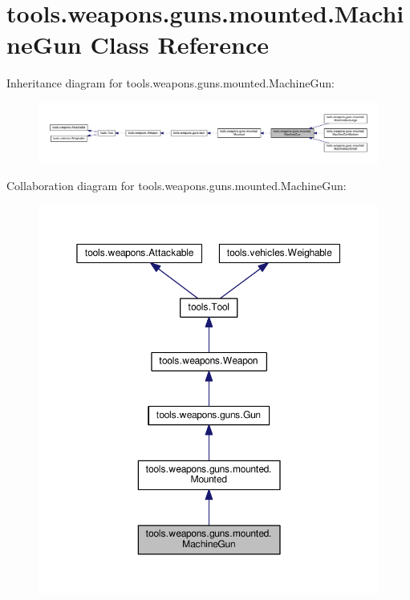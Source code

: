 \hypertarget{classtools_1_1weapons_1_1guns_1_1mounted_1_1_machine_gun}{}\section{tools.\+weapons.\+guns.\+mounted.\+Machine\+Gun Class Reference}
\label{classtools_1_1weapons_1_1guns_1_1mounted_1_1_machine_gun}


Inheritance diagram for tools.\+weapons.\+guns.\+mounted.\+Machine\+Gun\+:
\nopagebreak
\begin{figure}[H]
\begin{center}
\leavevmode
\includegraphics[width=350pt]{classtools_1_1weapons_1_1guns_1_1mounted_1_1_machine_gun__inherit__graph}
\end{center}
\end{figure}


Collaboration diagram for tools.\+weapons.\+guns.\+mounted.\+Machine\+Gun\+:
\nopagebreak
\begin{figure}[H]
\begin{center}
\leavevmode
\includegraphics[width=350pt]{classtools_1_1weapons_1_1guns_1_1mounted_1_1_machine_gun__coll__graph}
\end{center}
\end{figure}
